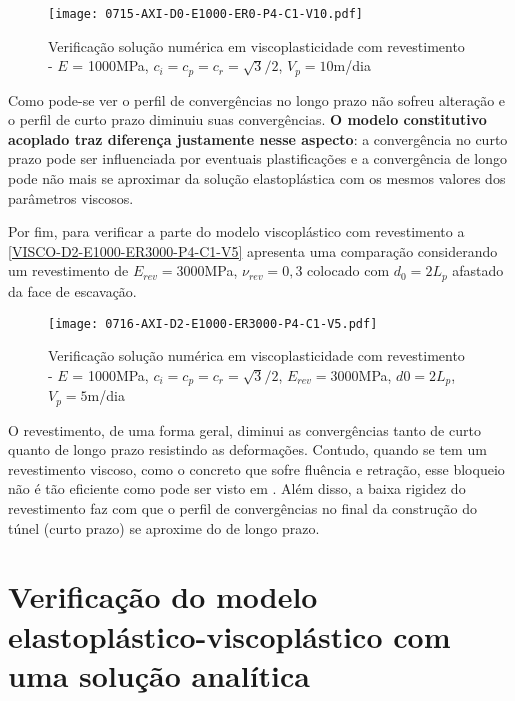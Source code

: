 \begin{figure}[H]
	\begin{center}
		\texttt{[image: 0715-AXI-D0-E1000-ER0-P4-C1-V10.pdf]}
	\end{center}
	\caption{\label{VISCO-D0-E1000-ER0-P4-C1-V10}Verificação solução numérica em viscoplasticidade com revestimento - $E$ = 1000MPa, $c_i=c_p=c_r=\sqrt{3}/2$, $V_p=10$m/dia}
\end{figure}
Como pode-se ver o perfil de convergências no longo prazo não sofreu alteração e o perfil de curto prazo diminuiu suas convergências. \textbf{O modelo constitutivo acoplado traz diferença justamente nesse aspecto}: a convergência no curto prazo pode ser influenciada por eventuais plastificações e a convergência de longo pode não mais se aproximar da solução elastoplástica com os mesmos valores dos parâmetros viscosos.

Por fim, para verificar a parte do modelo viscoplástico com revestimento a \autoref{VISCO-D2-E1000-ER3000-P4-C1-V5} apresenta uma comparação considerando um revestimento de $E_{rev}=3000$MPa, $\nu_{rev}=0,3$ colocado com $d_0=2L_p$ afastado da face de escavação.

\begin{figure}[H]
	\begin{center}
		\texttt{[image: 0716-AXI-D2-E1000-ER3000-P4-C1-V5.pdf]}
	\end{center}
	\caption{\label{VISCO-D2-E1000-ER3000-P4-C1-V5}Verificação solução numérica em viscoplasticidade com revestimento - $E$ = 1000MPa, $c_i=c_p=c_r=\sqrt{3}/2$, $E_{rev} = 3000$MPa, $d0=2L_p$, $V_p=5$m/dia}
\end{figure}
O revestimento, de uma forma geral, diminui as convergências tanto de curto quanto de longo prazo resistindo as deformações. Contudo, quando se tem um revestimento viscoso, como o concreto que sofre fluência e retração, esse bloqueio não é tão eficiente como pode ser visto em . Além disso, a baixa rigidez do revestimento faz com que o perfil de convergências no final da construção do túnel (curto prazo) se aproxime do de longo prazo.

\section{Verificação do modelo elastoplástico-viscoplástico com uma solução analítica}

